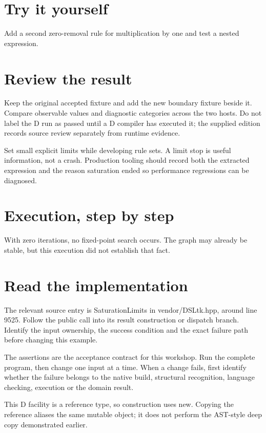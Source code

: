 \section*{Try it yourself}
Add a second zero-removal rule for multiplication by one and test a nested expression.

\section*{Review the result}
Keep the original accepted fixture and add the new boundary fixture beside it. Compare observable values and diagnostic categories across the two hosts. Do not label the D run as passed until a D compiler has executed it; the supplied edition records source review separately from runtime evidence.

\clearpage
{}
Set small explicit limits while developing rule sets. A limit stop is useful information, not a crash. Production tooling should record both the extracted expression and the reason saturation ended so performance regressions can be diagnosed.


\section*{Execution, step by step}
With zero iterations, no fixed-point search occurs. The graph may already be stable, but this execution did not establish that fact.

\section*{Read the implementation}
The relevant source entry is SaturationLimits in vendor/DSLtk.hpp, around line 9525. Follow the public call into its result construction or dispatch branch. Identify the input ownership, the success condition and the exact failure path before changing this example.

The assertions are the acceptance contract for this workshop. Run the complete program, then change one input at a time. When a change fails, first identify whether the failure belongs to the native build, structural recognition, language checking, execution or the domain result.

\clearpage
{}
This D facility is a reference type, so construction uses new. Copying the reference aliases the same mutable object; it does not perform the AST-style deep copy demonstrated earlier.

